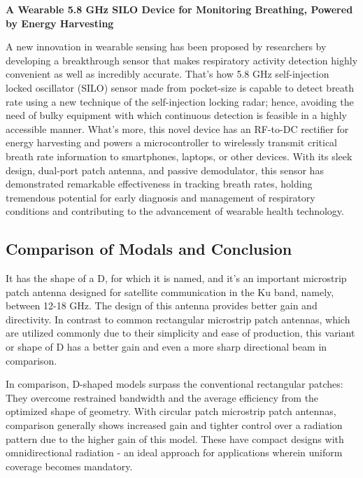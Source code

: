 \documentclass[12pt]{article}
\begin{document}
\noindent \textbf{A Wearable 5.8 GHz SILO Device for Monitoring Breathing, Powered by Energy Harvesting}
\par A new innovation in wearable sensing has been proposed by researchers by developing a breakthrough sensor that makes respiratory activity detection highly convenient as well as incredibly accurate. That's how 5.8 GHz self-injection locked oscillator (SILO) sensor made from pocket-size is capable to detect breath rate using a new technique of the self-injection locking radar; hence, avoiding the need of bulky equipment with which continuous detection is feasible in a highly accessible manner. What's more, this novel device has an RF-to-DC rectifier for energy harvesting and powers a microcontroller to wirelessly transmit critical breath rate information to smartphones, laptops, or other devices. With its sleek design, dual-port patch antenna, and passive demodulator, this sensor has demonstrated remarkable effectiveness in tracking breath rates, holding tremendous potential for early diagnosis and management of respiratory conditions and contributing to the advancement of wearable health technology.


\subsection{Comparison of Modals and Conclusion}

\par It has the shape of a D, for which it is named, and it's an important microstrip patch antenna designed for satellite communication in the Ku band, namely, between 12-18 GHz. The design of this antenna provides better gain and directivity. In contrast to common rectangular microstrip patch antennas, which are utilized commonly due to their simplicity and ease of production, this variant or shape of D has a better gain and even a more sharp directional beam in comparison.\\

\par In comparison, D-shaped models surpass the conventional rectangular patches: They overcome restrained bandwidth and the average efficiency from the optimized shape of geometry. With circular patch microstrip patch antennas, comparison generally shows increased gain and tighter control over a radiation pattern due to the higher gain of this model. These have compact designs with omnidirectional radiation - an ideal approach for applications wherein uniform coverage becomes mandatory.\\
\end{document}
